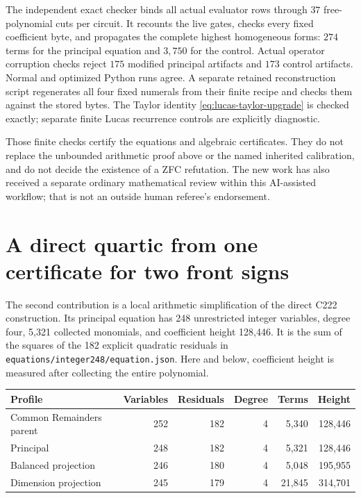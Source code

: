 \documentclass[11pt,letterpaper]{article}
\theoremstyle{definition}
\theoremstyle{remark}
\begin{document}
The independent exact checker binds all actual evaluator rows through $37$
free-polynomial cuts per circuit.  It recounts the live gates, checks every
fixed coefficient byte, and propagates the complete highest homogeneous
forms: $274$ terms for the
principal equation and $3{,}750$ for the control.  Actual operator corruption
checks reject $175$ modified principal artifacts and $173$ control artifacts.
Normal and optimized Python runs agree.  A separate retained reconstruction
script regenerates all four fixed numerals from their finite recipe and
checks them against the stored bytes.  The Taylor identity
\eqref{eq:lucas-taylor-upgrade} is checked exactly; separate finite Lucas
recurrence controls are explicitly diagnostic.

Those finite checks certify the equations and algebraic certificates.  They
do not replace the unbounded arithmetic proof above or the named inherited
calibration, and do not decide the existence of a ZFC refutation.  The new
work has also received a separate ordinary mathematical review within this
AI-assisted workflow; that is not an outside human referee's endorsement.

\section{A direct quartic from one certificate for two front signs}
\label{sec:direct-front}

The second contribution is a local arithmetic simplification of the direct
C222 construction.  Its principal equation has 248 unrestricted integer
variables, degree four, 5,321 collected monomials, and coefficient height
128,446.  It is the sum of the squares of the 182 explicit quadratic
residuals in
\texttt{equations/integer248/equation.json}.  Here and below, coefficient
height is measured after collecting the entire polynomial.

\begin{center}
\begin{tabular}{lrrrrr}
Profile & Variables & Residuals & Degree & Terms & Height\\ \hline
Common Remainders parent & 252 & 182 & 4 & 5,340 & 128,446\\
Principal & 248 & 182 & 4 & 5,321 & 128,446\\
Balanced projection & 246 & 180 & 4 & 5,048 & 195,955\\
Dimension projection & 245 & 179 & 4 & 21,845 & 314,701
\end{tabular}
\end{center}
\end{document}

